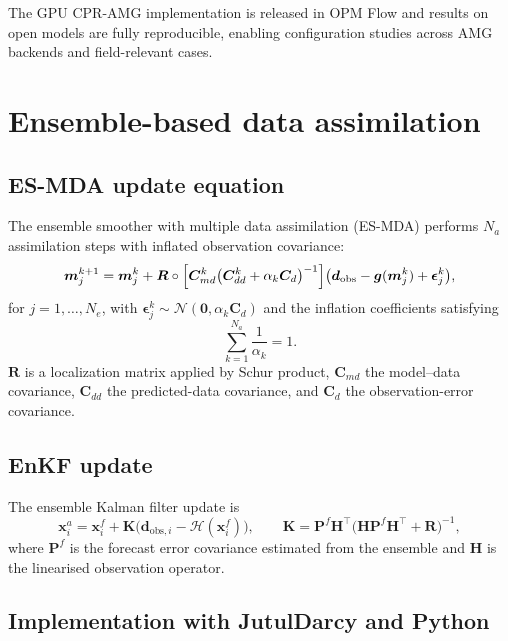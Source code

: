 \documentclass[10pt,a4paper]{article}
\begin{document}
The GPU CPR-AMG implementation is released in OPM Flow and results on open
models are fully reproducible, enabling configuration studies across AMG
backends and field-relevant cases.

\section{Ensemble-based data assimilation}

\subsection{ES-MDA update equation}

The ensemble smoother with multiple data assimilation (ES-MDA) performs $N_a$
assimilation steps with inflated observation covariance:
\begin{equation}
  \bm{m}_j^{k+1} = \bm{m}_j^{k}
  + \bm{R}\circ\Bigl[\bm{C}_{md}^{k}
    \bigl(\bm{C}_{dd}^{k}+\alpha_k\bm{C}_d\bigr)^{-1}\Bigr]
  \bigl(\bm{d}_{\mathrm{obs}}-\bm{g}(\bm{m}_j^{k})+\bm{\epsilon}_j^{k}\bigr),
  \label{eq:esmda}
\end{equation}
for $j=1,\dots,N_e$, with $\bm{\epsilon}_j^{k}\sim\mathcal{N}(\bm{0},\alpha_k\bm{C}_d)$
and the inflation coefficients satisfying
\begin{equation}
  \sum_{k=1}^{N_a}\frac{1}{\alpha_k} = 1.
  \label{eq:inflation}
\end{equation}
$\bm{R}$ is a localization matrix applied by Schur product, $\bm{C}_{md}$ the
model--data covariance, $\bm{C}_{dd}$ the predicted-data covariance, and
$\bm{C}_d$ the observation-error covariance.

\subsection{EnKF update}

The ensemble Kalman filter update is
\begin{equation}
  \bm{x}_i^{a} = \bm{x}_i^{f}
  + \bm{K}\bigl(\bm{d}_{\mathrm{obs},i}-\mathcal{H}(\bm{x}_i^{f})\bigr),
  \qquad
  \bm{K} = \bm{P}^{f}\bm{H}^{\!\top}
  \bigl(\bm{H}\bm{P}^{f}\bm{H}^{\!\top}+\bm{R}\bigr)^{-1},
  \label{eq:enkf}
\end{equation}
where $\bm{P}^{f}$ is the forecast error covariance estimated from the
ensemble and $\bm{H}$ is the linearised observation operator.

\subsection{Implementation with JutulDarcy and Python}
\end{document}
